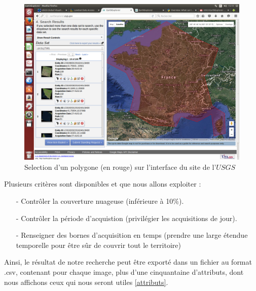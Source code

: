 \documentclass{book}
\begin{document}
\begin{figure}[H]
\begin{center}
\includegraphics[scale=0.3]{images/polygon_selection.png}
\end{center}
\caption{Selection d'un polygone (en rouge) sur l'interface du site de l'$USGS$}
\label{selection}
\end{figure}

\clearpage

Plusieurs critères sont disponibles et que nous allons exploiter :\\

\begin{itemize}

\item[-] Contr\^{o}ler la couverture nuageuse (inférieure à 10\%).
\item[-] Contr\^{o}ler la période d'acquistion (privilégier les acquisitions de jour).
\item[-] Renseigner des bornes d'acquisition en temps (prendre une large étendue temporelle pour être s\^{u}r de couvrir tout le territoire)

\end{itemize}

Ainsi, le résultat de notre recherche peut être exporté dans un fichier au format .csv, contenant pour chaque image, plus d'une 
cinquantaine d'attributs, dont nous affichons ceux qui nous seront utiles \ref{attributs}.\\
\end{document}

